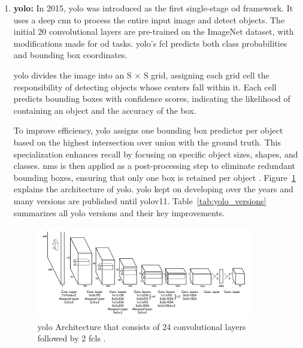\begin{enumerate}
    \item \textbf{\gls{yolo}:} In 2015, \gls{yolo} was introduced as the first single-stage \gls{od} framework. It uses a deep \gls{cnn} to process the entire input image and detect objects. The initial 20 convolutional layers are pre-trained on the ImageNet dataset, with modifications made for \gls{od} tasks. \gls{yolo}’s \gls{fcl} predicts both class probabilities and bounding box coordinates.

    \gls{yolo} divides the image into an S × S grid, assigning each grid cell the responsibility of detecting objects whose centers fall within it. Each cell predicts bounding boxes with confidence scores, indicating the likelihood of containing an object and the accuracy of the box.

    To improve efficiency, \gls{yolo} assigns one bounding box predictor per object based on the highest intersection over union with the ground truth. This specialization enhances recall by focusing on specific object sizes, shapes, and classes. \gls{nms} is then applied as a post-processing step to eliminate redundant bounding boxes, ensuring that only one box is retained per object \cite{YOLO}. Figure~\ref{YOLO} explains the architecture of \gls{yolo}. \gls{yolo} kept on developing over the years and many versions are published until \gls{yolo}v11. Table~\ref{tab:yolo_versions} summarizes all \gls{yolo} versions and their key improvements.

    \begin{figure}[ht]
        \centering
        \includegraphics[width=0.9\textwidth]{Figures/YOLO.PNG} 
        \caption{\gls{yolo} Architecture that consists of 24 convolutional layers followed by 2 \gls{fcl}s \cite{YOLO}.}
        \label{YOLO}
    \end{figure}



\end{enumerate}
